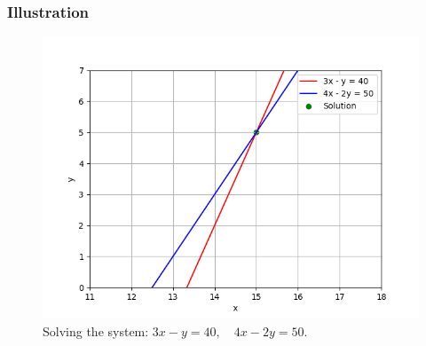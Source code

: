 \documentclass{beamer}
\numberwithin{equation}{section}
\begin{document}
\begin{frame}
\frametitle{Illustration}
\begin{figure}
  \centering
  \includegraphics[width=0.8\columnwidth]{figs/fig.png}
  \caption{Solving the system: $3x - y = 40,\quad 4x - 2y = 50$.}
\end{figure}
\end{frame}
\end{document}
